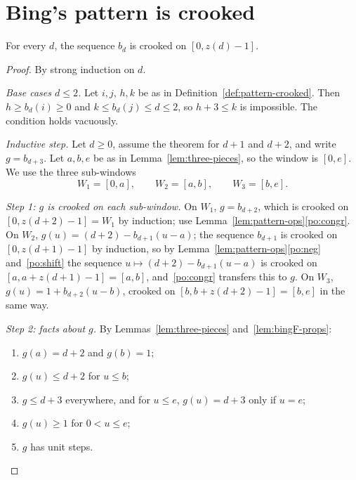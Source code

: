 
\section{Bing's pattern is crooked}

\begin{theorem}\label{thm:bingF-crooked}
For every $d$, the sequence $b_d$ is crooked on $[0,z(d)-1]$.
\end{theorem}

\begin{proof}
By strong induction on $d$.

\emph{Base cases $d\le2$.} Let $i,j$, $h,k$ be as in Definition~\ref{def:pattern-crooked}. Then
$h\ge b_d(i)\ge0$ and $k\le b_d(j)\le d\le2$, so $h+3\le k$ is impossible. The condition holds
vacuously.

\emph{Inductive step.} Let $d\ge0$, assume the theorem for $d+1$ and $d+2$, and write
$g=b_{d+3}$. Let $a,b,e$ be as in Lemma~\ref{lem:three-pieces}, so the window is $[0,e]$. We use
the three sub-windows
\[
W_1=[0,a],\qquad W_2=[a,b],\qquad W_3=[b,e].
\]

\emph{Step 1: $g$ is crooked on each sub-window.} On $W_1$, $g=b_{d+2}$, which is crooked on
$[0,z(d+2)-1]=W_1$ by induction; use Lemma~\ref{lem:pattern-ops}\ref{po:congr}. On $W_2$,
$g(u)=(d+2)-b_{d+1}(u-a)$; the sequence $b_{d+1}$ is crooked on $[0,z(d+1)-1]$ by induction, so
by Lemma~\ref{lem:pattern-ops}\ref{po:neg} and~\ref{po:shift} the sequence $u\mapsto
(d+2)-b_{d+1}(u-a)$ is crooked on $[a,a+z(d+1)-1]=[a,b]$, and~\ref{po:congr} transfers this to
$g$. On $W_3$, $g(u)=1+b_{d+2}(u-b)$, crooked on $[b,b+z(d+2)-1]=[b,e]$ in the same way.

\emph{Step 2: facts about $g$.} By Lemmas~\ref{lem:three-pieces} and~\ref{lem:bingF-props}:
\begin{enumerate}[label=(F\arabic*)]
\item\label{F:a} $g(a)=d+2$ and $g(b)=1$;
\item\label{F:le} $g(u)\le d+2$ for $u\le b$;
\item\label{F:top} $g\le d+3$ everywhere, and for $u\le e$, $g(u)=d+3$ only if $u=e$;
\item\label{F:pos} $g(u)\ge1$ for $0<u\le e$;
\item\label{F:lip} $g$ has unit steps.
\end{enumerate}


\end{proof}
